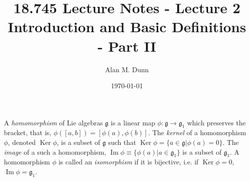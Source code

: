 \documentclass[aps,onecolumn,secnumarabic,nobalancelastpage,amsmath,amssymb]{revtex4}
\DeclareMathOperator{\Ker}{Ker}
\DeclareMathOperator{\Image}{Im}
\begin{document}
\title{18.745 Lecture Notes - Lecture 2 \\
Introduction and Basic Definitions - Part II}
\author{Alan M. Dunn}
\date{\today}
\maketitle

\newcommand{\g}[0]{\ensuremath{\mathord{\mathfrak{g}}}}
\newcommand{\f}[0]{\ensuremath{\mathbb{F}}}
\newcommand{\s}[0]{\ensuremath{\text{ }}}
\newcommand{\K}[0]{\ensuremath{\Ker \phi}}
\newcommand{\I}[0]{\ensuremath{\Image \phi}}
\newcommand{\+}[0]{\ensuremath{\oplus}}

A {\slshape homomorphism} of Lie algebras {\g} is a linear map $\phi: \g
\rightarrow \g_1$ which preserves the bracket, that is, $\phi([a,b]) =
[\phi(a),\phi(b)]$.  The {\slshape kernel} of a homomorphism $\phi$, denoted
\K, is a subset of {\g} such that $\K = \{ a \in \g | \phi(a) = 0\}$.  The
{\slshape image} of a such a homomorphism, $\I \equiv \{\phi(a) | a \in
\g_1\}$ is a subset of $\g_1$. A homomorphism $\phi$ is called an {\slshape
isomorphism} if it is bijective, i.e. if $\K = 0$, $\I = \g_1$. 
\end{document}
